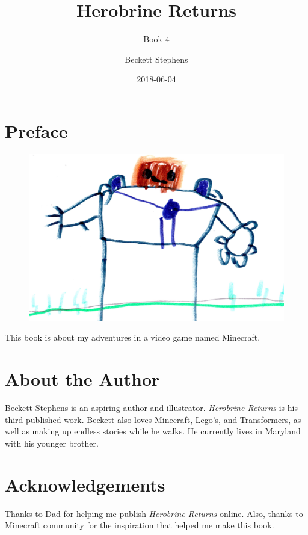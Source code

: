 \documentclass[12pt,oneside]{krantz}
\title{Herobrine Returns}
\subtitle{Book 4}
\author{Beckett Stephens}
\date{2018-06-04}
\begin{document}
\maketitle

{
\setcounter{tocdepth}{1}
\tableofcontents
}
\chapter*{Preface}\label{preface}


\begin{figure}
\centering
\includegraphics{img/1-herobrine-medium.jpg}
\caption{}
\end{figure}

This book is about my adventures in a video game named Minecraft.

\chapter*{About the Author}\label{about-the-author}


Beckett Stephens is an aspiring author and illustrator. \emph{Herobrine
Returns} is his third published work. Beckett also loves Minecraft,
Lego's, and Transformers, as well as making up endless stories while he
walks. He currently lives in Maryland with his younger brother.

\chapter*{Acknowledgements}\label{acknowledgements}


Thanks to Dad for helping me publish \emph{Herobrine Returns} online.
Also, thanks to Minecraft community for the inspiration that helped me
make this book.
\end{document}
